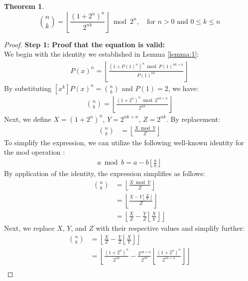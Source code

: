 \documentclass{article}
\theoremstyle{plain}
\theoremstyle{definition}
\newtheorem{thm}{Theorem}
\begin{document}
\begin{thm}
\label{thm:3}
\begin{equation}
\binom{n}{k} = \left\lfloor\frac{(1 + 2^{n})^{n}}{2^{n k}}\right\rfloor \bmod{2^{n}}, \quad \text{for } n > 0 \text{ and } 0 \leq k \leq n
\end{equation}
\end{thm}
\begin{proof}
\textbf{Step 1: Proof that the equation is valid:} \\
We begin with the identity we established in Lemma \ref{lemma:1}:
\begin{align}
 [x^k] P(x)^{n} = \left\lfloor\frac{(1 + P(1)^{n})^{n} \bmod P(1)^{n k + n}}{P(1)^{n k}}\right\rfloor
\end{align}
By substituting $[x^k] P(x)^{n} = \binom{n}{k}$ and $P(1) = 2$, we have: 
\begin{align}
\label{equation:timecomplexity}
\binom{n}{k} = \left\lfloor\frac{(1 + 2^{n})^{n} \bmod 2^{n k + n}}{2^{n k}}\right\rfloor
\end{align}
Next, we define $X = (1 + 2^{n})^{n}$, $Y = 2^{n k + n}$, $Z = 2^{n k}$. By replacement:
\begin{align}
\binom{n}{k} &= \left\lfloor\frac{X \bmod Y}{Z}\right\rfloor
\end{align}
To simplify the expression, we can utilize the following well-known identity for the mod operation \cite{niven2008introduction}:
\begin{align}
\label{modidentity}
a \bmod{b} = a - b \left\lfloor \frac{a}{b} \right\rfloor
\end{align}
By application of the identity, the expression simplifies as follows:
\begin{align}
\binom{n}{k} &= \left\lfloor\frac{X \bmod Y}{Z}\right\rfloor\\ &= \left\lfloor\frac{X - Y \left\lfloor \frac{X}{Y} \right\rfloor}{Z}\right\rfloor\\ &= \left\lfloor\frac{X}{Z} - \frac{Y}{Z} \left\lfloor \frac{X}{Y} \right\rfloor\right\rfloor
\end{align}
Next, we replace $X$, $Y$, and $Z$ with their respective values and simplify further:
\begin{align}
\binom{n}{k} &= \left\lfloor\frac{X}{Z} - \frac{Y}{Z} \left\lfloor \frac{X}{Y} \right\rfloor\right\rfloor \\ 
&= \left\lfloor\frac{(1 + 2^{n})^{n}}{2^{n k}} - \frac{2^{n k + n}}{2^{n k}} \left\lfloor \frac{(1 + 2^{n})^{n}}{2^{n k + n}} \right\rfloor\right\rfloor \\

\end{align}
\end{proof}
\end{document}
